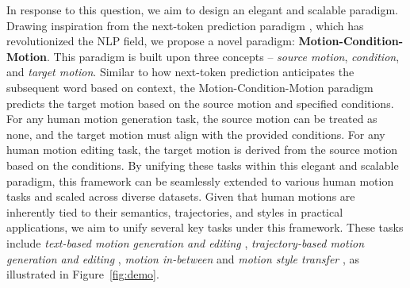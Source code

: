 In response to this question, we aim to design an elegant and scalable paradigm.
Drawing inspiration from the next-token prediction paradigm \cite{brown2020language,achiam2023gpt}, which has revolutionized the NLP field, we propose a novel paradigm: \textbf{Motion-Condition-Motion}. This paradigm is built upon three concepts -- \textit{source motion}, \textit{condition}, and \textit{target motion}. Similar to how next-token prediction anticipates the subsequent word based on context, the Motion-Condition-Motion paradigm predicts the target motion based on the source motion and specified conditions.
For any human motion generation task, the source motion can be treated as none, and the target motion must align with the provided conditions. For any human motion editing task, the target motion is derived from the source motion based on the conditions. By unifying these tasks within this elegant and scalable paradigm, this framework can be seamlessly extended to various human motion tasks and scaled across diverse datasets. 
Given that human motions are inherently tied to their semantics, trajectories, and styles in practical applications, we aim to unify several key tasks under this framework. These tasks include \textit{text-based motion generation and editing} \cite{tevet2023human,zhang2022motiondiffuse,tevet2022motionclip, athanasiou2024motionfix, goel2024iterative}, \textit{trajectory-based motion generation and editing} \cite{xie2023omnicontrol,dai2025motionlcm}, \textit{motion in-between} \cite{cohan2024flexible,harvey2020robust} and \textit{motion style transfer} \cite{Song_2024_CVPR,zhong2025smoodi}, as illustrated in Figure~\ref{fig:demo}.


